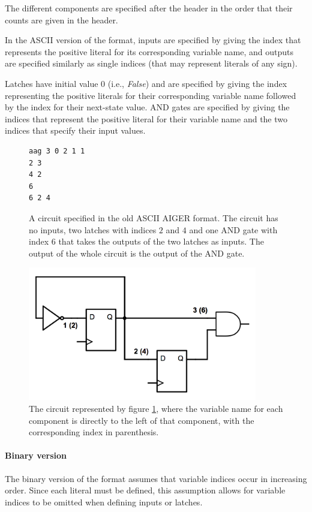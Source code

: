 \documentclass[12pt,a4paper,twoside,openright]{report}
\begin{document}
{{The different components are specified after the header
in the order that their counts are given in the header.

In the ASCII version of the format, inputs are specified by giving the
index that represents the positive literal for its corresponding variable name,
and outputs are specified similarly as single indices (that may represent
literals of any sign).

Latches have initial value 0 (i.e., {\it False}) and are specified by giving the
index representing the positive literals for their corresponding variable name
followed by the index for their next-state value.
AND gates are specified by giving the indices that represent the positive literal
for their variable name and the two indices that specify their input values.

\begin{figure}[!ht]
\centering
\begin{verbatim}
aag 3 0 2 1 1
2 3
4 2
6
6 2 4
\end{verbatim}
\caption{
A circuit specified in the old ASCII AIGER format. The circuit has
no inputs, two latches with indices $2$ and $4$ and one AND gate
with index $6$ that takes the outputs of the two latches as inputs.
The output of the whole circuit is the output of the AND gate.
}
\label{aagCircuit}
\end{figure}

\begin{figure}[!ht]
\centering
\includegraphics[width=100mm]{circuit.png}
\caption{The circuit represented by figure \ref{aagCircuit}, where
the variable name for each component is directly to the left of that
component, with the corresponding index in parenthesis.}
\end{figure}
}

\paragraph{Binary version}{
The binary version of the format assumes that variable indices
occur in increasing order. Since each literal must be defined, this assumption
allows for variable indices to be omitted when defining inputs or latches.

}}
\end{document}
